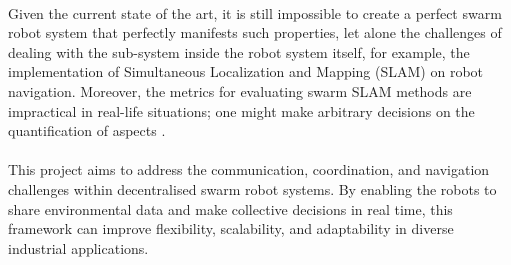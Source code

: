 \paragraph*{}
Given the current state of the art, it is still impossible to create a perfect swarm robot system that perfectly manifests such properties, let alone the challenges of dealing with the sub-system inside the robot system itself, for example, the implementation of Simultaneous Localization and Mapping (SLAM) on robot navigation. Moreover, the metrics for evaluating swarm SLAM methods are impractical in real-life situations; one might make arbitrary decisions on the quantification of aspects \cite{kegeleirs2021swarm}. 

\paragraph*{}
This project aims to address the communication, coordination, and navigation challenges within decentralised swarm robot systems. By enabling the robots to share environmental data and make collective decisions in real time, this framework can improve flexibility, scalability, and adaptability in diverse industrial applications. 